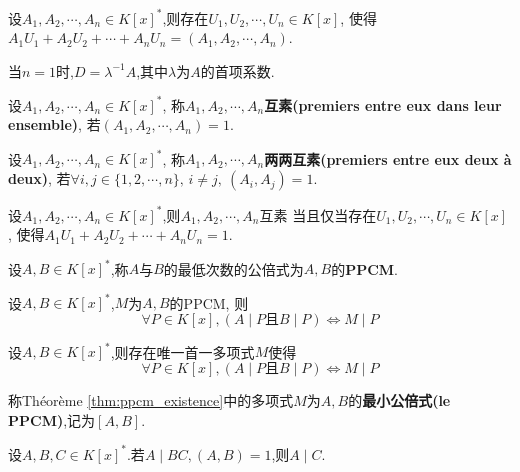 \begin{prop}
    设$A_1, A_2, \cdots, A_n \in K[x]^*$,则存在$U_1, U_2, \cdots, U_n \in K[x]$,
    使得$A_1U_1 + A_2U_2 + \cdots + A_nU_n = (A_1, A_2, \cdots, A_n)$.
\end{prop}

\begin{rqq}
    当$n = 1$时,$D = \lambda^{-1} A$,其中$\lambda$为$A$的首项系数.
\end{rqq}

\begin{deff}
    设$A_1, A_2, \cdots, A_n \in K[x]^*$,
    称$A_1, A_2, \cdots, A_n$\textbf{互素(premiers entre eux dans leur ensemble)},
    若$(A_1, A_2, \cdots, A_n) = 1$.
\end{deff}

\begin{deff}
    设$A_1, A_2, \cdots, A_n \in K[x]^*$,
    称$A_1, A_2, \cdots, A_n$\textbf{两两互素(premiers entre eux deux à deux)},
    若$\forall i, j \in \{ 1, 2, \cdots, n \},\, i \neq j,\ (A_i, A_j) = 1$.
\end{deff}

\begin{prop}
    设$A_1, A_2, \cdots, A_n \in K[x]^*$,则$A_1, A_2, \cdots, A_n$互素
    当且仅当存在$U_1, U_2, \cdots, U_n \in K[x]$,
    使得$A_1U_1 + A_2U_2 + \cdots + A_nU_n = 1$.
\end{prop}

\begin{deff}
    设$A, B \in K[x]^*$,称$A$与$B$的最低次数的公倍式为$A, B$的\textbf{PPCM}.
\end{deff}

\begin{prop}
    设$A, B \in K[x]^*$,$M$为$A, B$的PPCM,
    则\[ \forall P \in K[x], (A \mid P \text{且} B \mid P) \iff  M \mid P \]
\end{prop}

\begin{thm}\label{thm:ppcm_existence}
    设$A, B \in K[x]^*$,则存在唯一首一多项式$M$使得
    \[ \forall P \in K[x], (A \mid P \text{且} B \mid P) \iff  M \mid P \]
\end{thm}

\begin{deff}
    称Théorème \ref{thm:ppcm_existence}中的多项式$M$为$A, B$的\textbf{最小公倍式(le PPCM)},记为$[A, B]$.
\end{deff}

\begin{thm}
    设$A, B, C \in K[x]^*$.若$A \mid BC, (A, B) = 1$,则$A \mid C$.
\end{thm}

